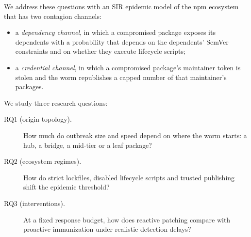We address these questions with an SIR epidemic model of the npm ecosystem that has two contagion
channels:
\begin{itemize}
  \item a \emph{dependency channel}, in which a compromised package exposes its dependents with a
        probability that depends on the dependents' SemVer constraints and on whether they execute
        lifecycle scripts;
  \item a \emph{credential channel}, in which a compromised package's maintainer token is stolen and
        the worm republishes a capped number of that maintainer's packages.
\end{itemize}

We study three research questions:
\begin{description}
  \item[RQ1 (origin topology).] How much do outbreak size and speed depend on where the worm starts:
        a hub, a bridge, a mid-tier or a leaf package?
  \item[RQ2 (ecosystem regimes).] How do strict lockfiles, disabled lifecycle scripts and trusted
        publishing shift the epidemic threshold?
  \item[RQ3 (interventions).] At a fixed response budget, how does reactive patching compare with
        proactive immunization under realistic detection delays?
\end{description}

